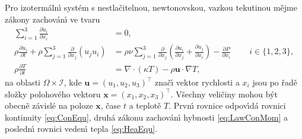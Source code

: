         Pro izoterm\'{a}ln\'{\i} syst\'{e}m s nestla\v{c}itelnou, newtonovskou, vazkou tekutinou m\v{e}jme z\'{a}kony zachov\'{a}n\'{\i} ve tvaru 
        \begin{subequations}
        \label{eq:DefCasLaw3}
        \begin{align}
            \sum_{i=1}^{3}\frac{\partial u_i}{\partial x_i} &= 0, \label{eq:DefCasMom3} \\
            \rho \frac{\partial u_i}{\partial t} + \rho \sum_{j=1}^{3}\frac{\partial}{\partial x_j} (u_j u_i) &= \rho \nu \sum_{j=1}^{3}\frac{\partial}{\partial x_j} \left( \frac{\partial u_i}{\partial x_j} + \frac{\partial u_j}{\partial x_i} \right) - \frac{\partial P}{\partial x_i} \qquad \ i \in \{ 1,2,3 \}, \label{eq:DefCasMas3} \\
            \rho \frac{\partial T}{\partial t} &= \nabla \cdot ( \kappa T) - \rho \boldsymbol{u} \cdot \nabla T, \label{eq:DefConPotEne}
        \end{align}    
        \end{subequations}
        na oblasti $\Omega \times \mathcal{I}$, kde $\boldsymbol{u} = (u_1,u_2,u_3)^\intercal$ zna\v{c}\'{\i} vektor rychlosti a $x_i$ jsou po \v{r}ad\v{e} slo\v{z}ky polohov\'{e}ho vektoru $\boldsymbol{x} = (x_1,x_2,x_3)^\intercal$. V\v{s}echny veli\v{c}iny mohou b\'{y}t obecn\v{e} z\'{a}visl\'{e} na poloze $\boldsymbol{x}$, \v{c}ase $t$ a teplot\v{e} $T$. Prvn\'{\i} rovnice odpov\'{\i}d\'{a} rovnici kontinuity \eqref{eq:ConEqu}, druh\'{a} z\'{a}konu zachov\'{a}n\'{\i} hybnosti \eqref{eq:LawConMom} a posledn\'{\i} rovnici veden\'{\i} tepla \eqref{eq:HeaEqu}.
        

